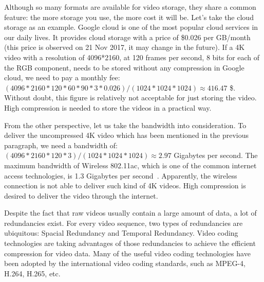 Although so many formats are available for video storage, they share a common
feature: the more storage you use, the more cost it will be.
Let's take the cloud storage as an example.
Google cloud is one of the most popular cloud services in our daily lives.
It provides cloud storage with a price
of \$0.026 per GB/month~\parencite{RN202}
(this price is observed on 21 Nov 2017, it may change in the future).
If a 4K video with a resolution of 4096*2160,
at 120 frames per second,
8 bits for each of the RGB component, needs to be stored without
any compression in Google cloud,
we need to pay a monthly fee:
\((4096*2160*120*60*90*3*0.026)/(1024*1024*1024) \approx 416.47\) \$.
Without doubt, this figure is relatively not acceptable for just
storing the video.
High compression is needed to store the videos in a practical way.

From the other perspective, let us take the bandwidth into consideration.
To deliver the uncompressed 4K video which has been mentioned in
the previous paragraph, we need a bandwidth of:
\((4096*2160*120*3)/(1024*1024*1024) \approx 2.97\) Gigabytes per second.
The maximum bandwidth of Wireless 802.11ac, which is one of the common
internet access technologies, is 1.3 Gigabytes per second~\parencite{RN203}.
Apparently, the wireless connection is not able to deliver such kind of
4K videos.
High compression is desired to deliver the video through the internet.

Despite the fact that raw videos usually contain a large amount of data,
a lot of redundancies exist.
For every video sequence, two types of redundancies are ubiquitous: Spacial
Redundancy and Temporal Redundancy.
Video coding technologies are taking advantages of those redundancies to
achieve the efficient compression for video data.
Many of the useful video coding technologies have been adopted by the
international video coding standards, such as MPEG-4, H.264, H.265, etc.


